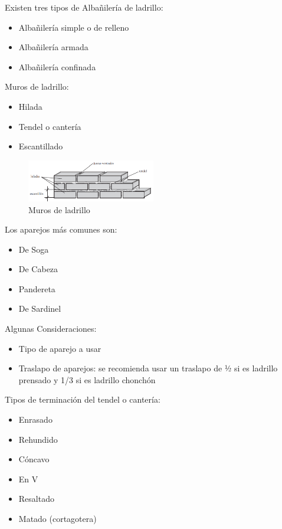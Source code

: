 Existen tres tipos de Albañilería de ladrillo:
\begin{itemize}
    \item Albañilería simple o de relleno
    \item Albañilería armada
    \item Albañilería confinada
\end{itemize}

Muros de ladrillo:
\begin{itemize}
    \item Hilada
    \item Tendel o cantería
    \item Escantillado
\end{itemize}

\begin{figure}[h]
    \centering
    \includegraphics[width=0.5\textwidth]{FOTOS/muro_ladrillo.png}
    \caption{Muros de ladrillo}
    \label{fig:muros_ladrillo}
\end{figure}

Los aparejos más comunes son:
\begin{itemize}
    \item De Soga
    \item De Cabeza
    \item Pandereta
    \item De Sardinel
\end{itemize}

Algunas Consideraciones:
\begin{itemize}
    \item Tipo de aparejo a usar
    \item Traslapo de aparejos: se recomienda usar un traslapo de ½ si es ladrillo prensado y 1/3 si es ladrillo chonchón
\end{itemize}

Tipos de terminación del tendel o cantería:
\begin{itemize}
    \item Enrasado
    \item Rehundido
    \item Cóncavo
    \item En V
    \item Resaltado
    \item Matado (cortagotera)
\end{itemize}

